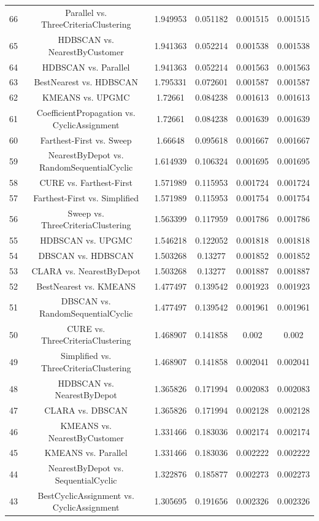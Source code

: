 \documentclass[a4paper,10pt]{article}
\begin{document}
\begin{landscape}
\begin{table}[!htp]
\begin{tabular}{cccccc}
66&Parallel vs. ThreeCriteriaClustering&1.949953&0.051182&0.001515&0.001515\\
65&HDBSCAN vs. NearestByCustomer&1.941363&0.052214&0.001538&0.001538\\
64&HDBSCAN vs. Parallel&1.941363&0.052214&0.001563&0.001563\\
63&BestNearest vs. HDBSCAN&1.795331&0.072601&0.001587&0.001587\\
62&KMEANS vs. UPGMC&1.72661&0.084238&0.001613&0.001613\\
61&CoefficientPropagation vs. CyclicAssignment&1.72661&0.084238&0.001639&0.001639\\
60&Farthest-First vs. Sweep&1.66648&0.095618&0.001667&0.001667\\
59&NearestByDepot vs. RandomSequentialCyclic&1.614939&0.106324&0.001695&0.001695\\
58&CURE vs. Farthest-First&1.571989&0.115953&0.001724&0.001724\\
57&Farthest-First vs. Simplified&1.571989&0.115953&0.001754&0.001754\\
56&Sweep vs. ThreeCriteriaClustering&1.563399&0.117959&0.001786&0.001786\\
55&HDBSCAN vs. UPGMC&1.546218&0.122052&0.001818&0.001818\\
54&DBSCAN vs. HDBSCAN&1.503268&0.13277&0.001852&0.001852\\
53&CLARA vs. NearestByDepot&1.503268&0.13277&0.001887&0.001887\\
52&BestNearest vs. KMEANS&1.477497&0.139542&0.001923&0.001923\\
51&DBSCAN vs. RandomSequentialCyclic&1.477497&0.139542&0.001961&0.001961\\
50&CURE vs. ThreeCriteriaClustering&1.468907&0.141858&0.002&0.002\\
49&Simplified vs. ThreeCriteriaClustering&1.468907&0.141858&0.002041&0.002041\\
48&HDBSCAN vs. NearestByDepot&1.365826&0.171994&0.002083&0.002083\\
47&CLARA vs. DBSCAN&1.365826&0.171994&0.002128&0.002128\\
46&KMEANS vs. NearestByCustomer&1.331466&0.183036&0.002174&0.002174\\
45&KMEANS vs. Parallel&1.331466&0.183036&0.002222&0.002222\\
44&NearestByDepot vs. SequentialCyclic&1.322876&0.185877&0.002273&0.002273\\
43&BestCyclicAssignment vs. CyclicAssignment&1.305695&0.191656&0.002326&0.002326\\

\end{tabular}
\end{table}
\end{landscape}
\end{document}
